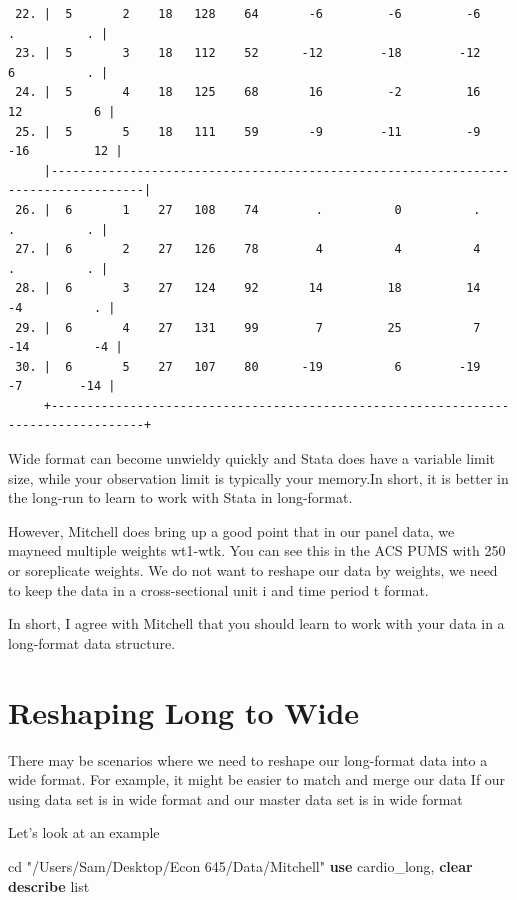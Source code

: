 \documentclass[
]{book}
\newenvironment{Shaded}{\begin{snugshade}}{\end{snugshade}}
\newcommand{\KeywordTok}[1]{\textcolor[rgb]{0.13,0.29,0.53}{\textbf{#1}}}
\newcommand{\NormalTok}[1]{#1}
\newcommand{\OtherTok}[1]{\textcolor[rgb]{0.56,0.35,0.01}{#1}}
\newcommand{\StringTok}[1]{\textcolor[rgb]{0.31,0.60,0.02}{#1}}
\begin{document}
\begin{verbatim}
 22. |  5       2    18   128    64       -6         -6         -6          .          . |
 23. |  5       3    18   112    52      -12        -18        -12          6          . |
 24. |  5       4    18   125    68       16         -2         16         12          6 |
 25. |  5       5    18   111    59       -9        -11         -9        -16         12 |
     |-----------------------------------------------------------------------------------|
 26. |  6       1    27   108    74        .          0          .          .          . |
 27. |  6       2    27   126    78        4          4          4          .          . |
 28. |  6       3    27   124    92       14         18         14         -4          . |
 29. |  6       4    27   131    99        7         25          7        -14         -4 |
 30. |  6       5    27   107    80      -19          6        -19         -7        -14 |
     +-----------------------------------------------------------------------------------+
\end{verbatim}

Wide format can become unwieldy quickly and Stata does have a variable limit size, while your observation limit is typically your memory.In short, it is better in the long-run to learn to work with Stata in long-format.

However, Mitchell does bring up a good point that in our panel data, we mayneed multiple weights wt1-wtk. You can see this in the ACS PUMS with 250 or soreplicate weights. We do not want to reshape our data by weights, we need to keep the data in a cross-sectional unit i and time period t format.

In short, I agree with Mitchell that you should learn to work with your data in a long-format data structure.

\section{Reshaping Long to Wide}\label{reshaping-long-to-wide}

There may be scenarios where we need to reshape our long-format data into
a wide format. For example, it might be easier to match and merge our data
If our using data set is in wide format and our master data set is in wide
format

Let's look at an example

\begin{Shaded}
\begin{Highlighting}[]
\NormalTok{cd }\StringTok{"/Users/Sam/Desktop/Econ 645/Data/Mitchell"}
\KeywordTok{use}\NormalTok{ cardio\_long, }\KeywordTok{clear}
\KeywordTok{describe} 
\OtherTok{list}
\end{Highlighting}
\end{Shaded}
\end{document}
